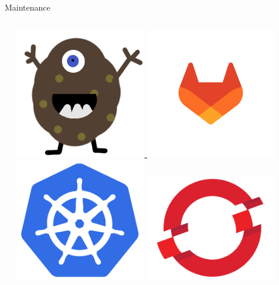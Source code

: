 \begin{frame}[t]{Maintenance}
\begin{columns}
\begin{column}{0.6\textwidth}
        \end{column}
        \begin{column}{0.4\textwidth}
            \href{https://github.com/cruft/cruft}{
                \includegraphics[width=0.45\textwidth]{figures/cruft.png}
            }
            \href{https://codebase.helmholtz.cloud/model-data-explorer/}{
                \includegraphics[width=0.45\textwidth]{figures/gitlab-logo.pdf}
            } \\
            \vspace{1em}
            \includegraphics[width=0.45\textwidth]{figures/Kubernetes_logo.svg.png}
            \includegraphics[width=0.45\textwidth]{figures/openshift.png} \\

\end{column}
\end{columns}
\end{frame}
